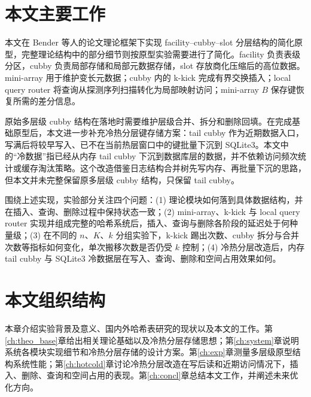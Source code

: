 \section{本文主要工作}

本文在 Bender 等人的论文\cite{bender2022otsh}理论框架下实现 facility--cubby--slot 分层结构的简化原型，完整理论结构中的部分细节则按原型实验需要进行了简化。facility 负责表级分区，cubby 负责局部存储和局部元数据存储，slot 存放商化压缩后的高位数据。mini-array 用于维护变长元数据；cubby 内的 k-kick 完成有界交换插入；local query router 将查询从探测序列扫描转化为局部映射访问；mini-array \(B\) 保存键恢复所需的差分信息。

原始多层级 cubby 结构在落地时需要维护层级合并、拆分和删除回填。在完成基础原型后，本文进一步补充冷热分层键存储方案：tail cubby 作为近期数据入口，写满后将较早写入、已不在当前热层窗口中的键批量下沉到 SQLite3。本文中的“冷数据”指已经从内存 tail cubby 下沉到数据库层的数据，并不依赖访问频次统计或缓存淘汰策略。这个改造借鉴日志结构合并树先写内存、再批量下沉的思路\cite{oneil1996lsm,dong2021rocksdb}，但本文并未完整保留原多层级 cubby 结构，只保留 tail cubby。

围绕上述实现，实验部分关注四个问题：(1) 理论模块如何落到具体数据结构，并在插入、查询、删除过程中保持状态一致；(2) mini-array、k-kick 与 local query router 实现并组成完整的哈希系统后，插入、查询与删除各阶段的延迟处于何种量级；(3) 在不同的 \(n\)、\(K\)、\(k\) 分组实验下，k-kick 踢出次数、cubby 拆分与合并次数等指标如何变化，单次搬移次数是否仍受 \(k\) 控制；(4) 冷热分层改造后，内存 tail cubby 与 SQLite3 冷数据层在写入、查询、删除和空间占用效果如何。

\section{本文组织结构}

本章介绍实验背景及意义、国内外哈希表研究的现状以及本文的工作。第\ref{ch:theo_base}章给出相关理论基础以及冷热分层存储思想；第\ref{ch:system}章说明系统各模块实现细节和冷热分层存储的设计方案。第\ref{ch:exp}章测量多层级原型结构系统性能；第\ref{ch:hotcold}章讨论冷热分层改造在写后读和近期访问情况下，插入、删除、查询和空间占用的表现。第\ref{ch:concl}章总结本文工作，并阐述未来优化方向。
